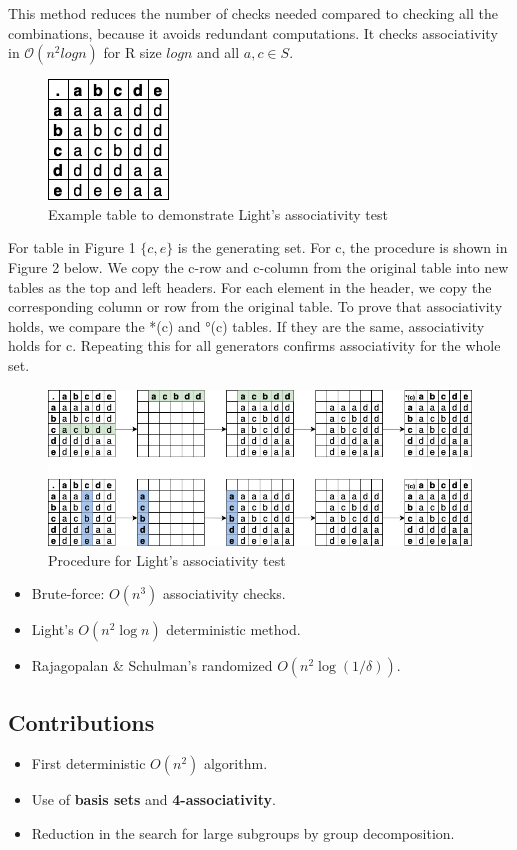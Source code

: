 \documentclass[sigconf]{acmart}
\begin{document}
This method reduces the number of checks needed compared to checking all the combinations, because it avoids redundant computations. It checks associativity in \(\mathcal{O}(n^2logn)\) for R size \(logn\) and all \(a,c \in S\).

\begin{figure}[H]
    \centering
    \includegraphics[width=0.125\linewidth]{original_table.png}
    \caption{Example table to demonstrate Light's associativity test}
\end{figure}

For table in Figure 1 \(\{c,e\}\) is the generating set. For c, the procedure is shown in Figure 2 below. We copy the c-row and c-column from the original table into new tables as the top and left headers. For each element in the header, we copy the corresponding column or row from the original table. To prove that associativity holds, we compare the *(c) and °(c) tables. If they are the same, associativity holds for c. Repeating this for all generators confirms associativity for the whole set.

\begin{figure}[H]
    \centering
    \includegraphics[width=0.5\linewidth]{Lights.png}
    \caption{Procedure for Light's associativity test}
\end{figure}

\begin{itemize}
    \item Brute-force: \( O(n^3) \) associativity checks.
    \item Light's \( O(n^2 \log n) \) deterministic method.
    \item Rajagopalan \& Schulman's randomized \( O(n^2 \log(1/\delta)) \).
\end{itemize}

\subsection{Contributions}
\begin{itemize}
    \item First deterministic \( O(n^2) \) algorithm.
    \item Use of \textbf{basis sets} and \textbf{4-associativity}.
    \item Reduction in the search for large subgroups by group decomposition.
\end{itemize}
\end{document}
